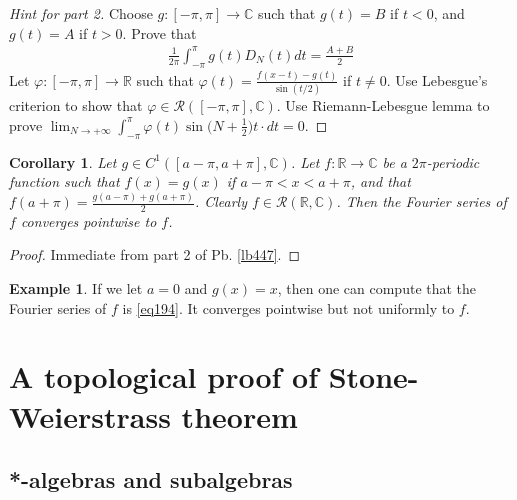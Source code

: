 \documentclass[12pt,b5paper,notitlepage]{article}
\theoremstyle{definition}
\newtheorem{eg}[df]{Example}
\theoremstyle{plain}
\newtheorem{co}[df]{Corollary}
\newcommand{\scr}{\mathscr}
\newcommand{\Cbb}{\mathbb C}
\newcommand{\Rbb}{\mathbb R}
\newcommand{\dps}{\displaystyle}
\numberwithin{equation}{section}
\begin{document}
\begin{proof}[Hint for part 2]
Choose $g:[-\pi,\pi]\rightarrow\Cbb$ such that $g(t)=B$ if $t<0$, and $g(t)=A$ if $t>0$. Prove that
\begin{align}
\frac 1{2\pi}\int_{-\pi}^\pi g(t)D_N(t)dt=\frac{A+B}2  \label{eq193}
\end{align}
Let $\varphi:[-\pi,\pi]\rightarrow \Rbb$ such that $\dps\varphi(t)=\frac{f(x-t)-g(t)}{\sin(t/2)}$ if $t\neq 0$. Use Lebesgue's criterion to show that $\varphi\in\scr R([-\pi,\pi],\Cbb)$. Use Riemann-Lebesgue lemma to prove $\dps\lim_{N\rightarrow+\infty}\int_{-\pi}^\pi \varphi(t)\sin\big(N+\frac 12\big)t\cdot dt=0$. %
\end{proof}


\begin{co}\label{lb448}
Let $g\in C^1([a-\pi,a+\pi],\Cbb)$. Let $f:\Rbb\rightarrow\Cbb$ be a $2\pi$-periodic function such that $f(x)=g(x)$ if $a-\pi<x<a+\pi$, and that $\dps f(a+\pi)=\frac{g(a-\pi)+g(a+\pi)}2$. Clearly $f\in\scr R(\Rbb,\Cbb)$. Then the Fourier series of $f$ converges pointwise to $f$.
\end{co}

\begin{proof}
Immediate from part 2 of Pb. \ref{lb447}.
\end{proof}

\begin{eg}
If we let $a=0$ and $g(x)=x$, then one can compute that the Fourier series of $f$ is \eqref{eq194}. It converges pointwise but not uniformly to $f$.
\end{eg}



















\newpage



\section{A topological proof of Stone-Weierstrass theorem}



\subsection{*-algebras and subalgebras}
\end{document}
